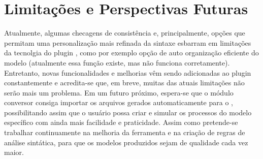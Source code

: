 \section{Limitações e Perspectivas Futuras}
\label{sec-consideracoes-finais-limitacoes-perspectivas}
Atualmente, algumas checagens de consistência e, principalmente, opções que permitam uma personalização mais refinada da sintaxe esbarram em limitações da tecnolgia do plugin \sirius, como por exemplo opção de auto organização eficiente do modelo (atualmente essa função existe, mas não funciona corretamente). Entretanto, novas funcionalidades e melhorias vêm sendo adicionadas ao plugin constantemente e acredita-se que, em breve, muitas das atuais limitações não serão mais um problema.
Em um futuro próximo, espera-se que o módulo conversor consiga importar os arquivos gerados automaticamente para o \zanshin, possibilitando assim que o usuário possa criar e simular os processos do modelo específico com ainda mais facilidade e praticidade. Assim como pretende-se trabalhar continuamente na melhoria da ferramenta e na criação de regras de análise sintática, para que os modelos produzidos sejam de qualidade cada vez maior.